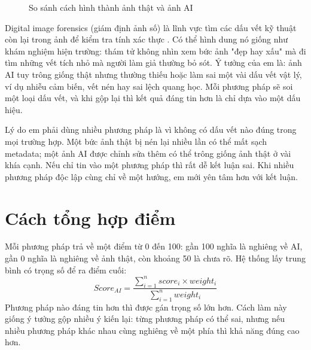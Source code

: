 \documentclass[14pt,a4paper,oneside]{report}
\begin{document}
\begin{figure}[H]
\centering
{}
\caption{So sánh cách hình thành ảnh thật và ảnh AI}
\label{fig:pipeline-compare}
\end{figure}

Digital image forensics (giám định ảnh số) là lĩnh vực tìm các dấu vết kỹ thuật còn lại trong ảnh để kiểm tra tính xác thực \cite{farid,verdoliva}. Có thể hình dung nó giống như khám nghiệm hiện trường: thám tử không nhìn xem bức ảnh "đẹp hay xấu" mà đi tìm những vết tích nhỏ mà người làm giả thường bỏ sót. Ý tưởng của em là: ảnh AI tuy trông giống thật nhưng thường thiếu hoặc làm sai một vài dấu vết vật lý, ví dụ nhiễu cảm biến, vết nén hay sai lệch quang học. Mỗi phương pháp sẽ soi một loại dấu vết, và khi gộp lại thì kết quả đáng tin hơn là chỉ dựa vào một dấu hiệu.

Lý do em phải dùng nhiều phương pháp là vì không có dấu vết nào đúng trong mọi trường hợp. Một bức ảnh thật bị nén lại nhiều lần có thể mất sạch metadata; một ảnh AI được chỉnh sửa thêm có thể trông giống ảnh thật ở vài khía cạnh. Nếu chỉ tin vào một phương pháp thì rất dễ kết luận sai. Khi nhiều phương pháp độc lập cùng chỉ về một hướng, em mới yên tâm hơn với kết luận.

\section{Cách tổng hợp điểm}
Mỗi phương pháp trả về một điểm từ 0 đến 100: gần 100 nghĩa là nghiêng về AI, gần 0 nghĩa là nghiêng về ảnh thật, còn khoảng 50 là chưa rõ. Hệ thống lấy trung bình có trọng số để ra điểm cuối:
\[
Score_{AI}=\frac{\sum_{i=1}^{n} score_i \times weight_i}{\sum_{i=1}^{n} weight_i}
\]
Phương pháp nào đáng tin hơn thì được gán trọng số lớn hơn. Cách làm này giống ý tưởng gộp nhiều ý kiến lại: từng phương pháp có thể sai, nhưng nếu nhiều phương pháp khác nhau cùng nghiêng về một phía thì khả năng đúng cao hơn.
\end{document}
